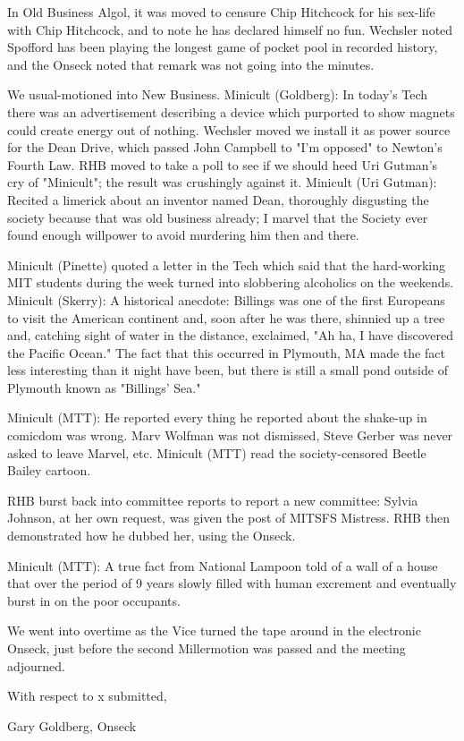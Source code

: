 \documentclass[12pt]{article}
\begin{document}
In Old Business Algol, it was moved to censure Chip Hitchcock for his sex-life with Chip Hitchcock, and to note he has declared himself no fun. Wechsler noted Spofford has been playing the longest game of pocket pool in recorded history, and the Onseck noted that remark was not going into the minutes.

We usual-motioned into New Business. Minicult (Goldberg): In today's Tech there was an advertisement describing a device which purported to show magnets could create energy out of nothing. Wechsler moved we install it as power source for the Dean Drive, which passed John Campbell to "I'm opposed" to Newton's Fourth Law. RHB moved to take a poll to see if we should heed Uri Gutman's cry of "Minicult"; the result was crushingly against it. Minicult (Uri Gutman): Recited a limerick about an inventor named Dean, thoroughly disgusting the society because that was old business already; I marvel that the Society ever found enough willpower to avoid murdering him then and there.

Minicult (Pinette) quoted a letter in the Tech which said that the hard-working MIT students during the week turned into slobbering alcoholics on the weekends. Minicult (Skerry): A historical anecdote: Billings was one of the first Europeans to visit the American continent and, soon after he was there, shinnied up a tree and, catching sight of water in the distance, exclaimed, "Ah ha, I have discovered the Pacific Ocean." The fact that this occurred in Plymouth, MA made the fact less interesting than it night have been, but there is still a small pond outside of Plymouth known as "Billings' Sea."

Minicult (MTT): He reported every thing he reported about the shake-up in comicdom was wrong. Marv Wolfman was not dismissed, Steve Gerber was never asked to leave Marvel, etc. Minicult (MTT) read the society-censored Beetle Bailey cartoon.

RHB burst back into committee reports to report a new committee: Sylvia Johnson, at her own request, was given the post of MITSFS Mistress. RHB then demonstrated how he dubbed her, using the Onseck.

Minicult (MTT): A true fact from National Lampoon told of a wall of a house that over the period of 9 years slowly filled with human excrement and eventually burst in on the poor occupants.

We went into overtime as the Vice turned the tape around in the electronic Onseck, just before the second Millermotion was passed and the meeting adjourned.

\vspace{12pt}

\centerline{With respect to x submitted,}
\centerline{Gary Goldberg, Onseck}
\end{document}
